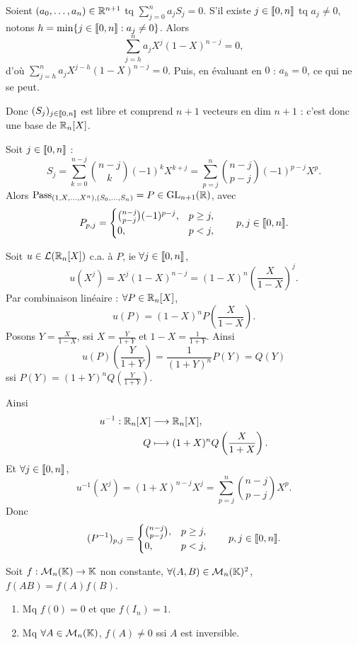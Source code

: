 \begin{solution}
Soient $(a_0,\ldots,a_n)\in\mathbb R^{n+1}$ tq $\sum_{j=0}^na_jS_j=0$. S'il existe
$j\in\llbracket 0,n\rrbracket$ tq $a_j\neq0$, notons
$h=\min\{j\in\llbracket 0,n\rrbracket:a_j\neq0\}$. Alors
\[
\sum_{j=h}^na_jX^j(1-X)^{n-j}=0,
\]
d'où $\sum_{j=h}^na_jX^{j-h}(1-X)^{n-j}=0$. Puis, en évaluant en $0$ : $a_h=0$, ce qui
ne se peut.

Donc $(S_j)_{j\in\llbracket 0,n\rrbracket}$ est libre et comprend $n+1$ vecteurs en dim $n+1$ :
c'est donc une base de $\mathbb R_n[X]$.

Soit $j\in\llbracket 0,n\rrbracket$ :
\[
S_j=\sum_{k=0}^{n-j}\binom{n-j}{k}(-1)^kX^{k+j}
=\sum_{p=j}^n\binom{n-j}{p-j}(-1)^{p-j}X^p.
\]
Alors $\operatorname{Pass}_{(1,X,\ldots,X^n),(S_0,\ldots,S_n)}=P\in\operatorname{GL}_{n+1}(\mathbb R)$, avec
\[
P_{p,j}=\begin{cases}\binom{n-j}{p-j}(-1)^{p-j},&p\geq j,\\0,&p<j,
\end{cases}
\qquad p,j\in\llbracket 0,n\rrbracket.
\]

Soit $u\in\mathcal L(\mathbb R_n[X])$ c.a. à $P$, ie $\forall j\in\llbracket 0,n\rrbracket$,
\[
u(X^j)=X^j(1-X)^{n-j}=(1-X)^n\left(\frac X{1-X}\right)^j.
\]
Par combinaison linéaire : $\forall P\in\mathbb R_n[X]$,
\[
u(P)=(1-X)^nP\left(\frac X{1-X}\right).
\]
Posons $Y=\frac X{1-X}$, ssi $X=\frac Y{1+Y}$ et $1-X=\frac1{1+Y}$.
Ainsi
\[
u(P)\left(\frac Y{1+Y}\right)=\frac1{(1+Y)^n}P(Y)=Q(Y)
\]
ssi $P(Y)=(1+Y)^nQ\left(\frac Y{1+Y}\right)$.

Ainsi
\[
\begin{aligned}
u^{-1}:\mathbb R_n[X]&\longrightarrow\mathbb R_n[X],\\
Q&\longmapsto(1+X)^nQ\left(\frac X{1+X}\right).
\end{aligned}
\]
Et $\forall j\in\llbracket 0,n\rrbracket$,
\[
u^{-1}(X^j)=(1+X)^{n-j}X^j=\sum_{p=j}^n\binom{n-j}{p-j}X^p.
\]
Donc
\[
(P^{-1})_{p,j}=\begin{cases}\binom{n-j}{p-j},&p\geq j,\\0,&p<j,
\end{cases}
\qquad p,j\in\llbracket 0,n\rrbracket.
\]
\end{solution}


\begin{statementbox}
Soit $f:\mathcal M_n(\mathbb K)\to\mathbb K$ non constante,
$\forall(A,B)\in\mathcal M_n(\mathbb K)^2$, $f(AB)=f(A)f(B)$.
\begin{enumerate}[label=\arabic*)]
  \item Mq $f(0)=0$ et que $f(I_n)=1$.
  \item Mq $\forall A\in\mathcal M_n(\mathbb K)$, $f(A)\neq0$ ssi $A$ est inversible.
\end{enumerate}
\end{statementbox}

